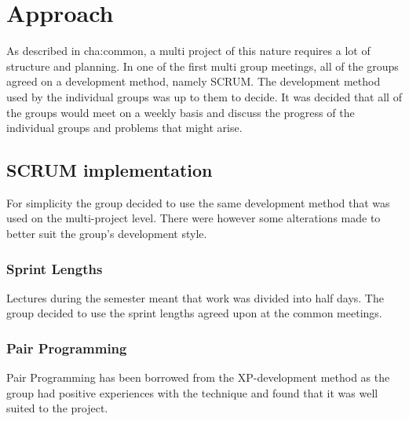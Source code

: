 \section{Approach}
As described in \ac{cha:common}, a multi project of this nature requires a lot of structure and planning. In one of the first multi group meetings, all of the groups agreed on a development method, namely SCRUM. The development method used by the individual groups was up to them to decide. It was decided that all of the groups would meet on a weekly basis and discuss the progress of the individual groups and problems that might arise.  

\subsection{SCRUM implementation}
\label{sub:scrum_implementation}
For simplicity the group decided to use the same development method that was used on the multi-project level. There were however some alterations made to better suit the group's development style.

\subsubsection{Sprint Lengths}
Lectures during the semester meant that work was divided into half days. The group decided to use the sprint lengths agreed upon at the common meetings. 

\subsubsection{Pair Programming}
Pair Programming has been borrowed from the XP-development method as the group had positive experiences with the technique and found that it was well suited to the project. 
